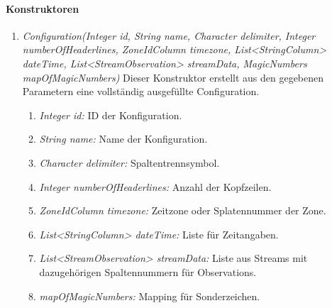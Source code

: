 \paragraph{Konstruktoren}
\begin{enumerate}[+]
	\item \textit{Configuration(Integer id, String name, Character delimiter, Integer numberOfHeaderlines, ZoneIdColumn timezone, List<StringColumn> dateTime, List<StreamObservation> streamData, MagicNumbers mapOfMagicNumbers)} Dieser Konstruktor erstellt aus den gegebenen Parametern eine vollständig ausgefüllte Configuration.
	\begin{enumerate}[$\bullet$]
		\item \textit{Integer id:} ID der Konfiguration.
		\item \textit{String name:} Name der Konfiguration.
		\item \textit{Character delimiter:} Spaltentrennsymbol.
		\item \textit{Integer numberOfHeaderlines:} Anzahl der Kopfzeilen.
		\item \textit{ZoneIdColumn timezone:} Zeitzone oder Splatennummer der Zone.
		\item \textit{List<StringColumn> dateTime:} Liste für Zeitangaben.
		\item \textit{List<StreamObservation> streamData:} Liste aus Streams mit dazugehörigen Spaltennummern für Observations.
		\item \textit{mapOfMagicNumbers:} Mapping für Sonderzeichen.
	\end{enumerate}
\end{enumerate}

